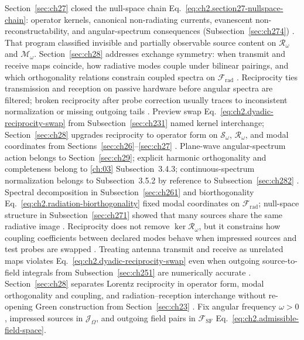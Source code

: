 Section~\ref{sec:ch27} closed the null-space chain
Eq.~\eqref{eq:ch2.section27-nullspace-chain}: operator kernels, canonical non-radiating
currents, evanescent non-reconstructability, and angular-spectrum consequences
(Subsection~\ref{sec:ch274}) \cite{stratton1941}. That program classified invisible and
partially observable source content on \(\mathcal{R}_\omega\) and \(\mathcal{M}_\omega\).
Section~\ref{sec:ch28} addresses exchange symmetry: when transmit and receive maps coincide,
how radiative modes couple under bilinear pairings, and which orthogonality relations constrain
coupled spectra on \(\mathcal{F}_{\mathrm{rad}}\) \cite{stratton1941}. Reciprocity ties
transmission and reception on passive hardware before angular spectra are filtered; broken
reciprocity after probe correction usually traces to inconsistent normalization or missing
outgoing tails \cite{hansen1988}. Preview swap Eq.~\eqref{eq:ch2.dyadic-reciprocity-swap}
from Subsection~\ref{sec:ch231} named kernel interchange; Section~\ref{sec:ch28} upgrades
reciprocity to operator form on \(\mathcal{S}_\omega\), \(\mathcal{R}_\omega\), and modal
coordinates from Sections~\ref{sec:ch26}--\ref{sec:ch27} \cite{stratton1941}. Plane-wave
angular-spectrum action belongs to Section~\ref{sec:ch29}; explicit harmonic orthogonality
and completeness belong to \ref{ch:03} Subsection~3.4.3; continuous-spectrum normalization
belongs to Subsection~3.5.2 by reference to Subsection~\ref{sec:ch282}
\cite{harrington2001}.
Spectral decomposition in Subsection~\ref{sec:ch261} and biorthogonality
Eq.~\eqref{eq:ch2.radiation-biorthogonality} fixed modal coordinates on
\(\mathcal{F}_{\mathrm{rad}}\); null-space structure in Subsection~\ref{sec:ch271} showed that
many sources share the same radiative image \cite{stratton1941}. Reciprocity does not remove
\(\ker\mathcal{R}_\omega\), but it constrains how coupling coefficients between declared modes
behave when impressed sources and test probes are swapped \cite{stratton1941}. Treating antenna
transmit and receive as unrelated maps violates Eq.~\eqref{eq:ch2.dyadic-reciprocity-swap} even
when outgoing source-to-field integrals from Subsection~\ref{sec:ch251} are numerically accurate
\cite{harrington2001}. Section~\ref{sec:ch28} separates Lorentz reciprocity in operator form,
modal orthogonality and coupling, and radiation--reception interchange without re-opening Green
construction from Section~\ref{sec:ch23} \cite{stratton1941}.
Fix angular frequency \(\omega>0\), impressed sources in \(\mathcal{J}_\Omega\), and outgoing
field pairs in \(\mathcal{F}_{\mathrm{SF}}\) Eq.~\eqref{eq:ch2.admissible-field-space}.
